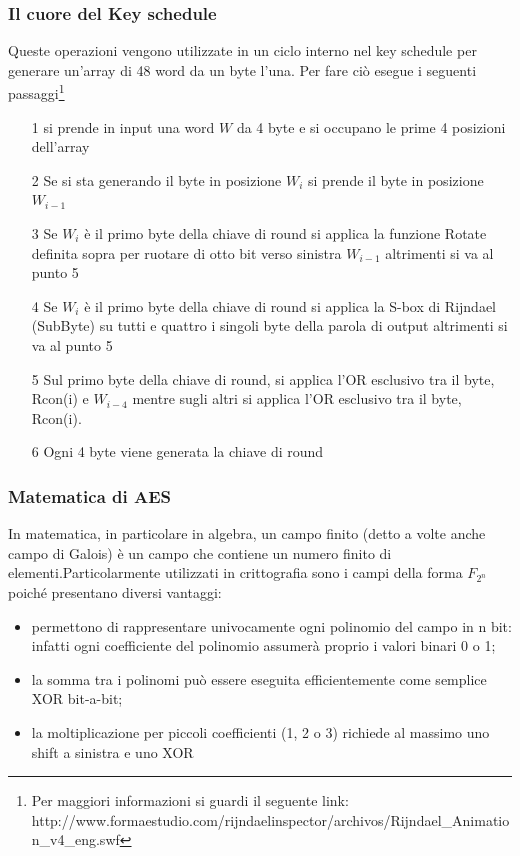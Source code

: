 \documentclass[10pt,a4paper]{article}
\begin{document}
\subsubsection{Il cuore del Key schedule}
Queste operazioni vengono utilizzate in un ciclo interno nel key schedule per generare un'array di 48 word da un byte l'una. Per fare ciò esegue i seguenti passaggi\footnote{Per maggiori informazioni si guardi il seguente link: http://www.formaestudio.com/rijndaelinspector/archivos/Rijndael\_Animation\_v4\_eng.swf }
\begin{itemize}
\item[1] si prende in input una word $W$ da 4 byte e si occupano le prime 4 posizioni dell'array
\item[2] Se si sta generando il byte in posizione $W_i$ si prende il byte in posizione $W_{i-1}$ 
\item[3] Se $W_i$ è il primo byte della chiave di round si applica la funzione Rotate definita sopra per ruotare di otto bit verso sinistra $W_{i-1}$ altrimenti si va al punto 5
\item[4] Se $W_i$ è il primo byte della chiave di round si applica la S-box di Rijndael (SubByte) su tutti e quattro i singoli byte della parola di output altrimenti si va al punto 5
\item[5] Sul primo byte della chiave di round, si applica l'OR esclusivo tra il byte, Rcon(i) e $W_{i-4}$ mentre sugli altri si applica l'OR esclusivo tra il byte, Rcon(i).
\item[6] Ogni 4 byte viene generata la chiave di round
\end{itemize}

\subsubsection{Matematica di AES}
In matematica, in particolare in algebra, un campo finito (detto a volte anche campo di Galois) è un campo che contiene un numero finito di elementi.Particolarmente utilizzati in crittografia sono i campi della forma $F_{2^n}$ poiché presentano diversi vantaggi:
\begin{itemize}
\item permettono di rappresentare univocamente ogni polinomio del campo in n bit: infatti ogni coefficiente del polinomio assumerà proprio i valori binari 0 o 1;
\item la somma tra i polinomi può essere eseguita efficientemente come semplice XOR bit-a-bit;
\item la moltiplicazione per piccoli coefficienti (1, 2 o 3) richiede al massimo uno shift a sinistra e uno XOR
\end{itemize}
\end{document}
